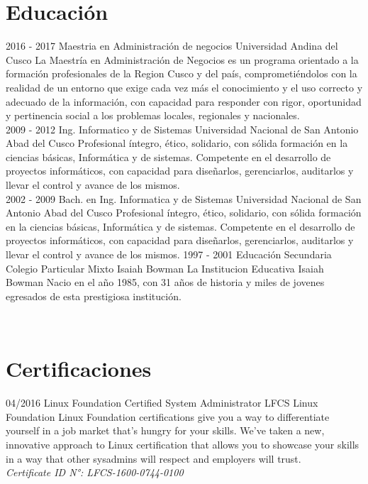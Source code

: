 \documentclass[]{friggeri-cv}
\begin{document}
\section{Educaci\'on}
\begin{entrylist}
    \entry
    {2016 - 2017}
    {Maestria en Administraci\'on de negocios}
    {Universidad Andina del Cusco}
    {La Maestr\'ia en Administraci\'on de Negocios es un programa orientado a la formaci\'on
    profesionales de la Region Cusco y  del pa\'is, comprometi\'endolos con la realidad
    de un entorno que exige cada vez m\'as el conocimiento y el uso correcto y
    adecuado de la informaci\'on, con capacidad para responder con rigor, oportunidad
    y pertinencia social a los problemas locales, regionales y nacionales.\\}
    \entry
    {2009 - 2012}
    {Ing. Informatico y de Sistemas}
    {Universidad Nacional de San Antonio Abad del Cusco}
    {Profesional \'integro, \'etico, solidario, con s\'olida formaci\'on en la ciencias
    b\'asicas, Inform\'atica y de sistemas. Competente en el desarrollo de proyectos
    inform\'aticos, con capacidad para dise\~narlos, gerenciarlos, auditarlos y
    llevar el control y avance de los mismos.\\}
    \entry
    {2002 - 2009}
    {Bach. en Ing. Informatica y de Sistemas}
    {Universidad Nacional de San Antonio Abad del Cusco}
    {Profesional \'integro, \'etico, solidario, con s\'olida formaci\'on en la ciencias
    b\'asicas, Inform\'atica y de sistemas. Competente en el desarrollo de proyectos
    inform\'aticos, con capacidad para dise\~narlos, gerenciarlos, auditarlos y
    llevar el control y avance de los mismos.}
    \entry
    {1997 - 2001}
    {Educaci\'on Secundaria}
    {Colegio Particular Mixto Isaiah Bowman}
    {La Institucion Educativa Isaiah Bowman Nacio en el a\~no 1985, con 31 a\~nos de historia
    y miles de jovenes egresados de esta prestigiosa instituci\'on.}
\end{entrylist}
\\
\section{Certificaciones}
\begin{entrylist}
    \entry
    {04/2016}
    {Linux Foundation Certified System Administrator LFCS}
    {Linux Foundation}
    {Linux Foundation certifications give you a way to differentiate yourself in
    a job market that's hungry for your skills. We've taken a new, innovative
    approach to Linux certification that allows you to showcase your skills in a
     way that other sysadmins will respect and employers will trust.\\
     \emph{Certificate ID N°{:} LFCS-1600-0744-0100}}
\end{entrylist}
\newpage
\end{document}
